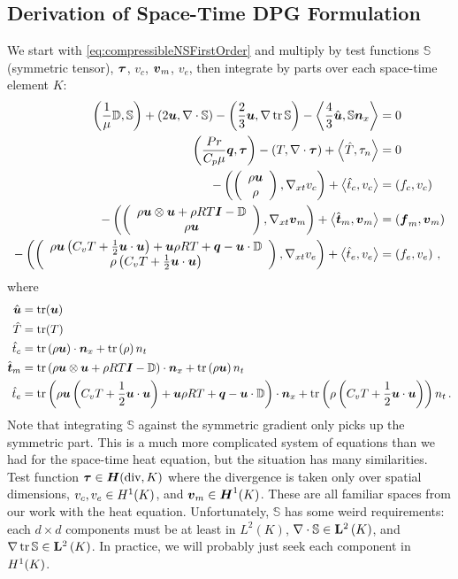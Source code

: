 \documentclass[Dissertation.tex]{subfiles}
\begin{document}
\subsection{Derivation of Space-Time DPG Formulation}
We start with \eqref{eq:compressibleNSFirstOrder} and multiply by test functions $\mathbb{S}$ (symmetric tensor), $\boldsymbol\tau$, $v_c$, $\boldsymbol v_m$, $v_e$, 
then integrate by parts over each space-time element $K$:
\begin{subequations}
\label{eq:compressibleNSBF}
\begin{align}
	\left( \frac{1}{\mu}\mathbb{D},\mathbb{S} \right)+\left( 2\boldsymbol u,\nabla\cdot\mathbb{S} \right)-\left( \frac{2}{3}\boldsymbol u,\nabla\operatorname*{tr}{\mathbb{S}} \right)
	-\left\langle \frac{4}{3}\hat{\boldsymbol u},\mathbb{S}\boldsymbol n_x \right\rangle&=0\\
	\left( \frac{Pr}{C_p\mu}\boldsymbol q,\boldsymbol\tau \right)-\left( T,\nabla\cdot\boldsymbol\tau \right)+\left\langle \hat T,\tau_n \right\rangle&=0\\
	-\left( \left( \begin{array}{c} \rho\boldsymbol u\\ \rho\\ \end{array} \right),\nabla_{xt} v_c \right)+\left\langle \hat t_c,v_c \right\rangle&=\left( f_c,v_c \right)\\
	-\left( \left( \begin{array}{c} \rho\boldsymbol u\otimes\boldsymbol u+\rho RT\boldsymbol I-\mathbb{D}\\ \rho\boldsymbol u\\ \end{array} \right),\nabla_{xt}\boldsymbol v_m \right)+\left\langle \hat{\boldsymbol t}_m,\boldsymbol v_m \right\rangle&=\left( \boldsymbol f_m,\boldsymbol v_m \right)\\
	-\left( \left( \begin{array}{c} \rho\boldsymbol u\left( C_v T+\frac{1}{2}\boldsymbol u\cdot\boldsymbol u \right)+\boldsymbol u\rho RT+\boldsymbol q-\boldsymbol u\cdot\mathbb{D}\\ \rho\left( C_v T+\frac{1}{2}\boldsymbol u\cdot\boldsymbol u \right)\\ \end{array} \right),\nabla_{xt} v_e \right)
	+\left\langle \hat t_e,v_e \right\rangle&=\left( f_e,v_e \right)\,,
\end{align}
\end{subequations}
where 
\begin{equation*}
\begin{aligned}
\hat{\boldsymbol u}&=\operatorname*{tr}(\boldsymbol u)\\
\hat T&=\operatorname*{tr}(T)\\
\hat t_c&=\operatorname*{tr}\left( \rho\boldsymbol u \right)\cdot\boldsymbol n_x
+\operatorname*{tr}\left( \rho \right)n_t\\
\hat{\boldsymbol t}_m&=\operatorname*{tr}\left( \rho\boldsymbol u\otimes\boldsymbol u+\rho RT\boldsymbol I-\mathbb{D} \right)\cdot\boldsymbol n_x
+\operatorname*{tr}\left( \rho\boldsymbol u \right) n_t\\
\hat t_e&=\operatorname*{tr}\left( \rho\boldsymbol u\left( C_v T+\frac{1}{2}\boldsymbol u\cdot\boldsymbol u \right)+\boldsymbol u\rho RT+\boldsymbol q-\boldsymbol u\cdot\mathbb{D} \right)\cdot\boldsymbol n_x
+\operatorname*{tr}\left( \rho\left( C_v T+\frac{1}{2}\boldsymbol u\cdot\boldsymbol u \right) \right)n_t\,.
\end{aligned}
\end{equation*}
Note that integrating $\mathbb{S}$ against the symmetric gradient only picks up the symmetric part.
This is a much more complicated system of equations than we had for the space-time heat equation, but the situation has many similarities.
Test function $\boldsymbol\tau\in\mbox{\boldmath $H$}(\text{div},K)$ where the divergence is taken only over spatial dimensions, $v_c,v_e\in H^{1}(K)$, and $\boldsymbol v_m\in\mbox{\boldmath $H$}^{1}(K)$.
These are all familiar spaces from our work with the heat equation.
Unfortunately, $\mathbb{S}$ has some weird requirements: each $d\times d$ components must be at least in $L^2(K)$, $\nabla\cdot\mathbb{S}\in\mathbf{L}^2\left( K \right)$, and
$\nabla\operatorname*{tr}{\mathbb{S}}\in\mathbf{L}^2\left( K \right)$.
In practice, we will probably just seek each component in $H^{1}(K)$.
\end{document}
